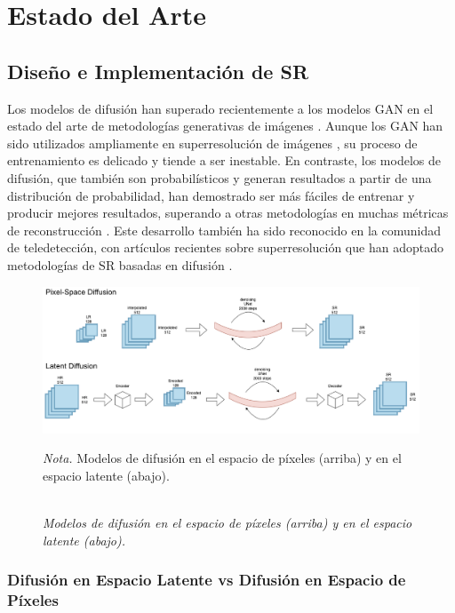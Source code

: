 \chapter{Estado del Arte}

\section{Diseño e Implementación de SR}
Los modelos de difusión \autocite{NEURIPS2020_4c5bcfec} han superado recientemente a los modelos GAN \autocite{NIPS2014_5ca3e9b1} en el estado del arte de metodologías generativas de imágenes \autocite{10081412}. Aunque los GAN han sido utilizados ampliamente en superresolución de imágenes \autocite{9044873}, su proceso de entrenamiento es delicado y tiende a ser inestable. En contraste, los modelos de difusión, que también son probabilísticos y generan resultados a partir de una distribución de probabilidad, han demostrado ser más fáciles de entrenar y producir mejores resultados, superando a otras metodologías en muchas métricas de reconstrucción \autocite{saharia2021image}. Este desarrollo también ha sido reconocido en la comunidad de teledetección, con artículos recientes sobre superresolución que han adoptado metodologías de SR basadas en difusión \autocite{rs14194834, 10057005, 103389fmars20231211981}.

\begin{figure}[H]
    \caption{\doublespacing \\ \textit{Modelos de difusión en el espacio de píxeles (arriba) y en el espacio latente (abajo).}} 
    \centering
    \includegraphics[width=1\linewidth]{images/lat_px_dif.png}
    \begin{justify}
        \textit{Nota.} Modelos de difusión en el espacio de píxeles (arriba) y en el espacio latente (abajo).
    \end{justify}                    
    \label{fig:pixel_latent_space}
\end{figure}

\subsection{Difusión en Espacio Latente vs Difusión en Espacio de Píxeles}

